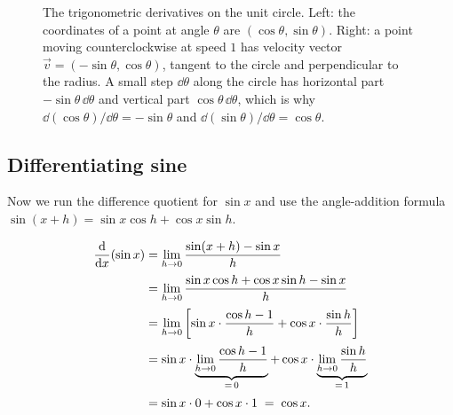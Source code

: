 \begin{figure}[H]
\caption{The trigonometric derivatives on the unit circle. Left: the coordinates of a point
at angle $\theta$ are $(\cos\theta, \sin\theta)$. Right: a point moving counterclockwise at speed $1$
has velocity vector $\vec{v} = (-\sin\theta, \cos\theta)$, tangent to the circle and perpendicular
to the radius. A small step $\dd\theta$ along the circle has horizontal part $-\sin\theta\,\dd\theta$
and vertical part $\cos\theta\,\dd\theta$, which is why
$\dd(\cos\theta)/\dd\theta = -\sin\theta$ and $\dd(\sin\theta)/\dd\theta = \cos\theta$.}
\label{ch12:fig-unit-circle}
\end{figure}

\subsection{Differentiating sine}

Now we run the difference quotient for $\sin x$ and use the angle-addition
formula $\sin(x+h) = \sin x\cos h + \cos x\sin h$.

\begin{align*}
\frac{\mathrm{d}}{\mathrm{d} x}\!\left(\sin x\right)
&= \lim_{h\to 0}\frac{\sin(x+h)-\sin x}{h}\\[2pt]
&= \lim_{h\to 0}\frac{\sin x\cos h + \cos x\sin h - \sin x}{h}\\[2pt]
&= \lim_{h\to 0}\left[\sin x\cdot\frac{\cos h - 1}{h}
                    + \cos x\cdot\frac{\sin h}{h}\right]\\[2pt]
&= \sin x\cdot\underbrace{\lim_{h\to0}\frac{\cos h-1}{h}}_{=\,0}
 + \cos x\cdot\underbrace{\lim_{h\to0}\frac{\sin h}{h}}_{=\,1}\\[2pt]
&= \sin x\cdot 0 + \cos x\cdot 1 \;=\; \cos x.
\end{align*}

